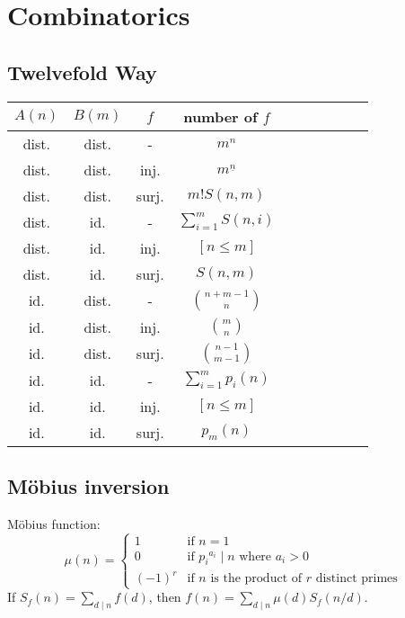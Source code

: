 \section{Combinatorics}
\subsection{Twelvefold Way}
\begin{table}[htbp]
  \centering
  \begin{tabular}{|c|c|c|c|c|c|c|c|c|c|}
  \hline
  $A (n)$ & $B (m)$ & $f$ & number of $f$ \\ \hline
  dist. & dist. & - & $m^n$ \\ \hline
  dist. & dist. & inj. & $m^{\underline{n}}$ \\ \hline
  dist. & dist. & surj. & $m! S(n, m)$ \\ \hline
  dist. & id. & - & $\sum_{i=1}^m S(n, i)$ \\ \hline
  dist. & id. & inj. & $[n \leq m]$ \\ \hline
  dist. & id. & surj. & $S(n, m)$ \\ \hline
  id. & dist. & - & $\binom{n+m-1}{n}$ \\ \hline
  id. & dist. & inj. & $\binom{m}{n}$ \\ \hline
  id. & dist. & surj. & $\binom{n-1}{m-1}$ \\ \hline
  id. & id. & - & $\sum_{i=1}^m p_i(n)$ \\ \hline
  id. & id. & inj. & $[n \leq m]$ \\ \hline
  id. & id. & surj. & $p_m(n)$ \\ \hline
  \end{tabular}
\end{table}

\subsection{M\"{o}bius inversion}
M\"{o}bius function:
$$ \mu(n) = \begin{cases} 1 & \text{if } n=1  \\ 0 & \text{if } {p_i}^{a_i} \mid n \text{ where } a_i > 0 \\ (-1)^r & \text{if } n \text{ is the product of } r \text{ distinct primes} \end{cases} $$
If $S_f(n) = \sum_{d \mid n} f(d)$, then $f(n) = \sum_{d \mid n} \mu(d) S_f(n/d)$.

